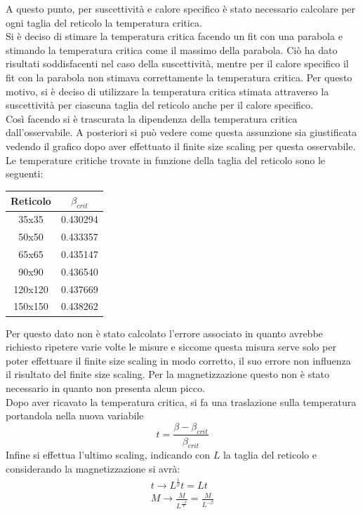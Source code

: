 A questo punto, per suscettività e calore specifico è stato necessario calcolare per ogni taglia del reticolo  la temperatura critica.\\
Si è deciso di stimare la temperatura critica facendo un fit con una parabola e stimando la temperatura critica come il massimo della parabola. Ciò ha dato risultati soddisfacenti nel caso della suscettività, mentre per il calore specifico il fit con la parabola non stimava correttamente la temperatura critica.
Per questo motivo, si è deciso di utilizzare la temperatura critica stimata attraverso la suscettività per ciascuna taglia del reticolo anche per il calore specifico. \\
Così facendo si è trascurata la dipendenza della temperatura critica dall'osservabile.
A posteriori si può vedere come questa assunzione sia giustificata vedendo il grafico dopo aver effettuato il finite size scaling per questa osservabile.\\
Le temperature critiche trovate in funzione della taglia del reticolo sono le seguenti:
\begin{center}
	\begin{tabular}{c c}
	\toprule
	Reticolo & $\beta_{crit}$ \\
	\midrule
	35x35 &  0.430294 \\ %
	50x50 &  0.433357 \\ %
	65x65 & 0.435147 \\ %
	90x90 & 0.436540\\
	120x120 & 0.437669 \\ %
	150x150 & 0.438262 \\
	\end{tabular}
\end{center}
Per questo dato non è stato calcolato l'errore associato in quanto avrebbe richiesto ripetere varie volte le misure e siccome questa misura serve solo per poter effettuare il finite size scaling in modo corretto, il suo errore non influenza il risultato del finite size scaling.
Per la magnetizzazione questo non è stato necessario in quanto non presenta alcun picco.\\
Dopo aver ricavato la temperatura critica, si fa una traslazione sulla temperatura portandola nella nuova variabile 
$$
	 t = \frac{\beta - \beta_{crit}}{\beta_{crit}}
$$ 
Infine si effettua l'ultimo scaling, indicando con $L$ la taglia del reticolo e considerando la magnetizzazione si avrà:
\begin{align*}
	t \longrightarrow L^{\frac{1}{\nu}} t = L t \\
	M \longrightarrow \frac{M}{L^{\frac{-\beta}{\nu}}} = \frac{M}{L^{-\beta}}
\end{align*}
